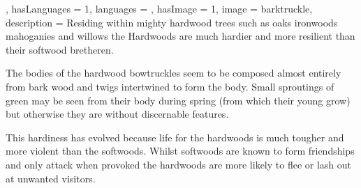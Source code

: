 {{, hasLanguages = 1, languages = , hasImage = 1, image = barktruckle, description = Residing within mighty hardwood trees such as oaks\comma{} ironwoods\comma{} mahoganies and willows\comma{} the Hardwoods are much hardier and more resilient than their softwood bretheren. 

The bodies of the hardwood bowtruckles seem to be composed almost entirely from bark\comma{} wood and twigs intertwined to form the body. Small sproutings of green may be seen from their body during spring (from which their young grow)\comma{} but otherwise they are without discernable features. 

This hardiness has evolved because life for the hardwoods is much tougher and more violent than the softwoods. Whilst softwoods are known to form friendships and only attack when provoked\comma{} the hardwoods are more likely to flee or lash out at unwanted visitors.}



}




